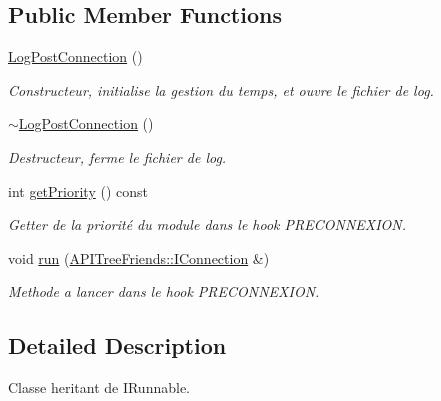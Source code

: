 \subsection*{Public Member Functions}
\begin{DoxyCompactItemize}
\item 
\hypertarget{class_log_post_connection_abb693a35256e759194bac14d69a87f5b}{}\hyperlink{class_log_post_connection_abb693a35256e759194bac14d69a87f5b}{Log\+Post\+Connection} ()\label{class_log_post_connection_abb693a35256e759194bac14d69a87f5b}

\begin{DoxyCompactList}\small\item\em Constructeur, initialise la gestion du temps, et ouvre le fichier de log. \end{DoxyCompactList}\item 
\hypertarget{class_log_post_connection_a7e58b3c3ea085fc43a5e9cf3318af9c4}{}\hyperlink{class_log_post_connection_a7e58b3c3ea085fc43a5e9cf3318af9c4}{$\sim$\+Log\+Post\+Connection} ()\label{class_log_post_connection_a7e58b3c3ea085fc43a5e9cf3318af9c4}

\begin{DoxyCompactList}\small\item\em Destructeur, ferme le fichier de log. \end{DoxyCompactList}\item 
int \hyperlink{class_log_post_connection_a1b2b1757ad578d1a91c3908e9fbad5fa}{get\+Priority} () const 
\begin{DoxyCompactList}\small\item\em Getter de la priorité du module dans le hook P\+R\+E\+C\+O\+N\+N\+E\+X\+I\+O\+N. \end{DoxyCompactList}\item 
\hypertarget{class_log_post_connection_a8c71f2051507093a74940bbf6f2c6a6b}{}void \hyperlink{class_log_post_connection_a8c71f2051507093a74940bbf6f2c6a6b}{run} (\hyperlink{class_a_p_i_tree_friends_1_1_i_connection}{A\+P\+I\+Tree\+Friends\+::\+I\+Connection} \&)\label{class_log_post_connection_a8c71f2051507093a74940bbf6f2c6a6b}

\begin{DoxyCompactList}\small\item\em Methode a lancer dans le hook P\+R\+E\+C\+O\+N\+N\+E\+X\+I\+O\+N. \end{DoxyCompactList}\end{DoxyCompactItemize}


\subsection{Detailed Description}
Classe heritant de I\+Runnable. 

